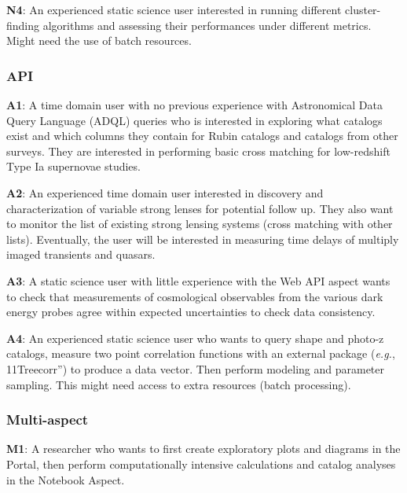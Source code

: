 \textbf{N4}:  An experienced static science user interested in running different cluster-finding algorithms and assessing their performances under different metrics. Might need the use of batch resources. 

\subsubsection{API}

\textbf{A1}: A time domain user with no previous experience with Astronomical Data Query Language (ADQL) queries who is interested in exploring what catalogs exist and which columns they contain for Rubin catalogs and catalogs from other surveys. They are interested in performing basic cross matching for low-redshift Type Ia supernovae studies. 

\textbf{A2}: An experienced time domain user interested in discovery and characterization of variable strong lenses for potential follow up. They also want to monitor the list of existing strong lensing systems (cross matching with other lists). Eventually, the user will be interested in measuring time delays of multiply imaged transients and quasars. 

\textbf{A3}: A static science user with little experience with the Web API aspect wants to check that measurements of cosmological observables from the various dark energy probes agree within expected uncertainties to check data consistency. 

\textbf{A4}: An experienced static science user who wants to query shape and photo-z catalogs, measure two point correlation functions with an external package (\emph{e.g.}, 11Treecorr”) to produce a data vector. Then perform modeling and parameter sampling. This might need access to extra resources (batch processing).

\subsubsection{Multi-aspect}

\textbf{M1}: A researcher who wants to first create exploratory plots and diagrams in the Portal, then perform computationally intensive calculations and catalog analyses in the Notebook Aspect. 





